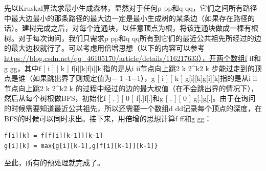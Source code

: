 \documentclass[9pt, b5paaper]{book}
\begin{document}
先以Kruskal算法求最小生成森林，显然对于任何p pp和q qq，它们之间所有路径中最大边最小的那条路径的最大边一定是最小生成树的某条边（如果存在路径的话）。建树完成之后，对每个连通块，以任意顶点为根，将该连通块做成一棵有根树。对于每次询问，我们只需求p pp和q qq所有到它们的最近公共祖先所经过的边的最大边权就行了。可以考虑用倍增思想（以下的内容可以参考\url{https://blog.csdn.net/qq_46105170/article/details/116217633），开两个数组f} ff和g gg，其中f [ i ] [ k ] f[i][k]f[i][k]指的是从i ii节点向上跳2 k 2\^{}k2 
k
 步能过走到的顶点是谁（如果跳出界了则规定值为− 1 -1−1），g [ i ] [ k ] g[i][k]g[i][k]指的是从i ii节点向上跳2 k 2\^{}k2 
k
 的过程中经过的边的最大权值（在不会跳出界的情况下），然后从每个树根做BFS，初始化f [ . ] [ 0 ] f[.]\footnotemark[1]{}f[.]\footnotemark[1]{}和g [ . ] [ 0 ] g[.]\footnotemark[1]{}g[.]\footnotemark[1]{}。由于在询问的时候需要知道最近公共祖先，所以还需要一个数组d dd记录每个顶点的深度，在BFS的时候可以同时求出。接下来，用倍增的思想计算f ff和g gg：
\begin{verbatim}
f[i][k] = f[f[i][k-1]][k-1]
g[i][k] = max{g[i][k-1],g[f[i][k-1]][k-1]}
\end{verbatim}
至此，所有的预处理就完成了。
\end{document}
